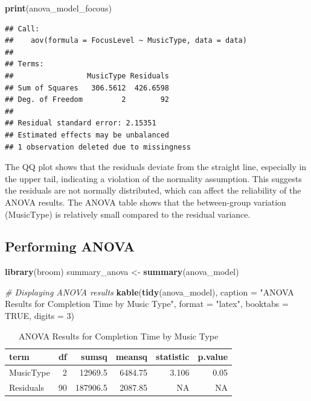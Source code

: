 \documentclass[
]{article}
\newenvironment{Shaded}{\begin{snugshade}}{\end{snugshade}}
\newcommand{\AttributeTok}[1]{\textcolor[rgb]{0.13,0.29,0.53}{#1}}
\newcommand{\CommentTok}[1]{\textcolor[rgb]{0.56,0.35,0.01}{\textit{#1}}}
\newcommand{\ConstantTok}[1]{\textcolor[rgb]{0.56,0.35,0.01}{#1}}
\newcommand{\DecValTok}[1]{\textcolor[rgb]{0.00,0.00,0.81}{#1}}
\newcommand{\FunctionTok}[1]{\textcolor[rgb]{0.13,0.29,0.53}{\textbf{#1}}}
\newcommand{\NormalTok}[1]{#1}
\newcommand{\OtherTok}[1]{\textcolor[rgb]{0.56,0.35,0.01}{#1}}
\newcommand{\StringTok}[1]{\textcolor[rgb]{0.31,0.60,0.02}{#1}}
\begin{document}
\begin{Shaded}
\begin{Highlighting}[]
\FunctionTok{print}\NormalTok{(anova\_model\_focous)}
\end{Highlighting}
\end{Shaded}

\begin{verbatim}
## Call:
##    aov(formula = FocusLevel ~ MusicType, data = data)
## 
## Terms:
##                 MusicType Residuals
## Sum of Squares   306.5612  426.6598
## Deg. of Freedom         2        92
## 
## Residual standard error: 2.15351
## Estimated effects may be unbalanced
## 1 observation deleted due to missingness
\end{verbatim}

The QQ plot shows that the residuals deviate from the straight line,
especially in the upper tail, indicating a violation of the normality
assumption. This suggests the residuals are not normally distributed,
which can affect the reliability of the ANOVA results. The ANOVA table
shows that the between-group variation (MusicType) is relatively small
compared to the residual variance.

\subsection{Performing ANOVA}\label{performing-anova}

\begin{Shaded}
\begin{Highlighting}[]
\FunctionTok{library}\NormalTok{(broom) }
\NormalTok{summary\_anova }\OtherTok{\textless{}{-}} \FunctionTok{summary}\NormalTok{(anova\_model)}

\CommentTok{\# Displaying ANOVA results}
\FunctionTok{kable}\NormalTok{(}\FunctionTok{tidy}\NormalTok{(anova\_model), }\AttributeTok{caption =} \StringTok{"ANOVA Results for Completion Time by Music Type"}\NormalTok{,}
             \AttributeTok{format =} \StringTok{"latex"}\NormalTok{, }\AttributeTok{booktabs =} \ConstantTok{TRUE}\NormalTok{, }\AttributeTok{digits =} \DecValTok{3}\NormalTok{)}
\end{Highlighting}
\end{Shaded}

\begin{table}

\caption{\label{tab:unnamed-chunk-10}ANOVA Results for Completion Time by Music Type}
\centering
\begin{tabular}[t]{lrrrrr}
\toprule
term & df & sumsq & meansq & statistic & p.value\\
\midrule
MusicType & 2 & 12969.5 & 6484.75 & 3.106 & 0.05\\
Residuals & 90 & 187906.5 & 2087.85 & NA & NA\\
\bottomrule
\end{tabular}
\end{table}
\end{document}
